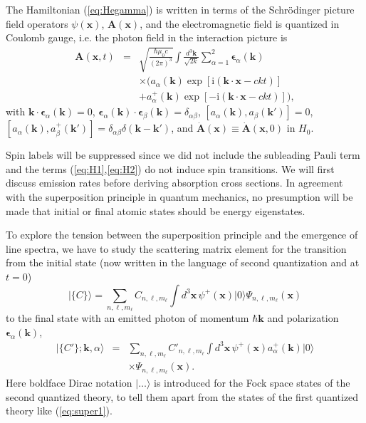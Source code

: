 \documentclass[final,3p,12pt]{elsarticle3}
\begin{document}
The Hamiltonian (\ref{eq:Hegamma}) is written in terms of the 
Schr\"o\-din\-ger picture field operators $\psi(\bm{x})$, $\bm{A}(\bm{x})$,
and the electromagnetic field is quantized in Coulomb gauge, i.e. the
photon field in the interaction picture is
\begin{eqnarray}\nonumber
\bm{A}(\bm{x},t)&=&\sqrt{\frac{\hbar\mu_0 c}{(2\pi)^3}}
\int\!\frac{d^3\bm{k}}{\sqrt{2k}}\sum_{\alpha=1}^2
\bm{\epsilon}_\alpha(\bm{k})
\\ \nonumber
&&\times\Big(
a_\alpha(\bm{k})
\exp[\mathrm{i}(\bm{k}\cdot\bm{x}-ckt)]
\\ \label{eq:Axt}
&&+a_{\alpha}^+(\bm{k})
\exp[-\mathrm{i}(\bm{k}\cdot\bm{x}-ckt)]\Big),
\end{eqnarray}
with $\bm{k}\cdot\bm{\epsilon}_\alpha(\bm{k})=0$,
$\bm{\epsilon}_\alpha(\bm{k})\cdot\bm{\epsilon}_\beta(\bm{k})=\delta_{\alpha\beta}$,
$[a_{\alpha}(\bm{k}),a_{\beta}(\bm{k}')]=0$, 
$[a_{\alpha}(\bm{k}),a_{\beta}^+(\bm{k}')]=\delta_{\alpha\beta}\delta(\bm{k}-\bm{k}')$,
and $\dot{\bm{A}}(\bm{x})\equiv\dot{\bm{A}}(\bm{x},0)$ in $H_0$.

Spin labels will be suppressed since we did not include the subleading Pauli term 
and the terms (\ref{eq:H1},\ref{eq:H2}) do not induce spin transitions.
We will first discuss emission rates before deriving absorption cross
sections. In agreement with the superposition principle in quantum mechanics,
no presumption will be made that initial or final atomic states should
be energy eigenstates.

To explore the tension between the superposition principle and the 
emergence of line spectra, we have to study the scattering matrix element for
the transition from the initial state (now written in the language of
second quantization and at $t=0$)
\begin{equation}\label{eq:lineinit}
\bm{|}\{C\}\bm{\rangle}=
\sum_{n,\ell,m_\ell}C_{n,\ell,m_\ell}\!\int\!d^3\bm{x}\,\psi^+(\bm{x})\bm{|}0\bm{\rangle}
\Psi_{n,\ell,m_\ell}(\bm{x})
\end{equation}
to the final state with an emitted photon of momentum $\hbar\bm{k}$
and polarization $\bm{\epsilon}_\alpha(\bm{k})$,
\begin{eqnarray}\nonumber
\bm{|}\{C'\};\bm{k},\alpha\bm{\rangle}&=&
\sum_{n,\ell,m_\ell}\!C'_{n,\ell,m_\ell}\!
\int\!d^3\bm{x}\,\psi^+(\bm{x})a^+_\alpha(\bm{k})\bm{|}0\bm{\rangle}
\\ \label{eq:linefinal}
&&\times
\Psi_{n,\ell,m_\ell}(\bm{x}).
\end{eqnarray}
Here boldface Dirac notation $\bm{|}\ldots\bm{\rangle}$ is introduced for 
the Fock space states of the second quantized theory, to tell them apart from
the states of the first quantized theory like (\ref{eq:super1}). 
\end{document}

